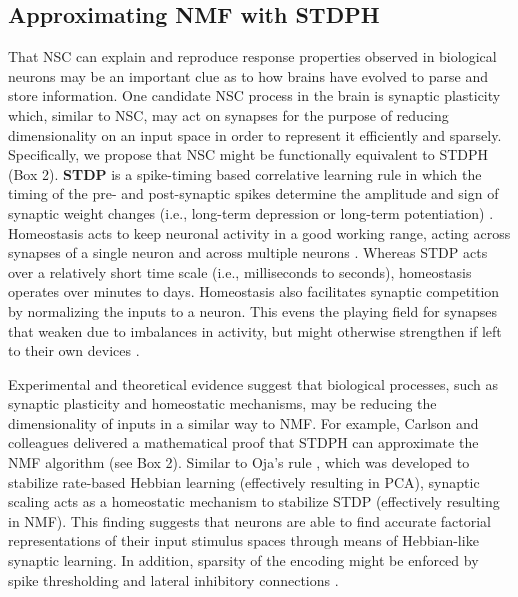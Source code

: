 \subsection{Approximating NMF with STDPH}

That \ac{NSC} can explain and reproduce response properties observed in biological neurons may be an important clue as to how brains have evolved to parse and store information. One candidate \ac{NSC} process in the brain is synaptic plasticity
which, similar to \ac{NSC},
may act on synapses for the purpose of reducing dimensionality on an input space in order to represent it efficiently and sparsely.
Specifically, we propose that \ac{NSC} might be functionally equivalent to \ac{STDPH}
(Box 2).
\textbf{\Ac{STDP}} is a spike-timing based correlative learning rule in which the
timing of the pre- and post-synaptic spikes determine the amplitude and sign
of synaptic weight changes 
(i.e., long-term depression or long-term potentiation)
\citep{BiPoo1998,SongAbbott2000}.
Homeostasis acts to keep neuronal activity in a good working range,
acting across synapses of a single neuron and across multiple neurons
\citep{turrigiano1998}.
Whereas \ac{STDP} acts over a relatively short time scale (i.e., milliseconds to seconds),
homeostasis operates over minutes to days.
Homeostasis also facilitates synaptic competition by normalizing the inputs to a neuron. 
This evens the playing field for synapses that weaken due to imbalances in activity, 
but might otherwise strengthen if left to their own devices \citep{chistiakova2015}.

Experimental and theoretical evidence suggest that biological processes, such as synaptic plasticity and homeostatic mechanisms, may be reducing the dimensionality of inputs in a similar way to NMF. For example, Carlson and colleagues \citep{Carlson2013} delivered a mathematical proof
that \ac{STDPH} can approximate the \ac{NMF} algorithm (see Box 2).
Similar to Oja's rule \citep{Oja1982}, which was developed to stabilize 
rate-based Hebbian learning
(effectively resulting in \ac{PCA}),
synaptic scaling acts as a homeostatic mechanism to stabilize \ac{STDP}
(effectively resulting in \ac{NMF}).
This finding suggests that neurons are able to find accurate factorial
representations of their input stimulus spaces through means of Hebbian-like
synaptic learning. In addition, sparsity of the encoding might be enforced by spike thresholding \citep{Rozell2008}
and lateral inhibitory connections \citep{Coultrip1992}.


